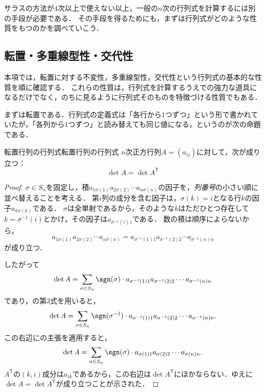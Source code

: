 サラスの方法が$4$次以上で使えない以上，一般の$n$次の行列式を計算するには別の手段が必要である．
その手段を得るためにも，まずは行列式がどのような性質をもつのかを調べていこう．

\subsection{転置・多重線型性・交代性}

本項では，転置に対する不変性，多重線型性，交代性という行列式の基本的な性質を順に確認する．
これらの性質は，行列式を計算するうえでの強力な道具になるだけでなく，のちに見るように行列式そのものを特徴づける性質でもある．

まずは転置である．行列式の定義式は「各行から$1$つずつ」という形で書かれていたが，「各列から$1$つずつ」と読み替えても同じ値になる，というのが次の命題である．


\begin{prop}{転置行列の行列式}{転置行列の行列式}
  $n$次正方行列$A = (a_{ij})$に対して，次が成り立つ：
  \[
  \det A = \det A^\mathsf{T} 
  \]
\end{prop}

\begin{tleftbar}
\begin{proof}
 $\sigma \in S_n$を固定し，積$a_{1\sigma(1)} a_{2\sigma(2)} \dotsm a_{n\sigma(n)}$の因子を，\emph{列番号}の小さい順に並べ替えることを考える．
 第$i$列の成分を含む因子は，$\sigma(k) = i$となる行$k$の因子$a_{k\sigma(k)}$である．
 $\sigma$は全単射であるから，そのような$k$はただひとつ存在して$k = \sigma^{-1}(i)$とかけ，その因子は$a_{\sigma^{-1}(i)\,i}$である．
 数の積は順序によらないから，
 \[
 a_{1\sigma(1)} a_{2\sigma(2)} \dotsm a_{n\sigma(n)} =  a_{\sigma^{-1}(1)1} a_{\sigma^{-1}(2)2} \dotsm a_{\sigma^{-1}(n)n}
 \]
 が成り立つ．

 したがって
 \[
  \det A = \sum_{\sigma \in S_n} \sgn(\sigma) \cdot a_{\sigma^{-1}(1)1} a_{\sigma^{-1}(2)2} \dotsm a_{\sigma^{-1}(n)n}
\]
であり，の第3式を用いると，
\[
\det A = \sum_{\sigma \in S_n} \sgn(\sigma^{-1}) \cdot a_{\sigma^{-1}(1)1} a_{\sigma^{-1}(2)2} \dotsm a_{\sigma^{-1}(n)n}.
\]
この右辺にの主張を適用すると，
\[
\det A = \sum_{\sigma \in S_n} \sgn (\sigma ) \cdot a_{\sigma(1)1} a_{\sigma(2)2} \dotsm a_{\sigma(n)n}.
\]
$A^\mathsf{T}$の$(k, i)$成分は$a_{ik}$であるから，この右辺は$\det A^\mathsf{T}$にほかならない．ゆえに$\det A = \det A^\mathsf{T}$が成り立つことが示された．
\end{proof}
\end{tleftbar}

